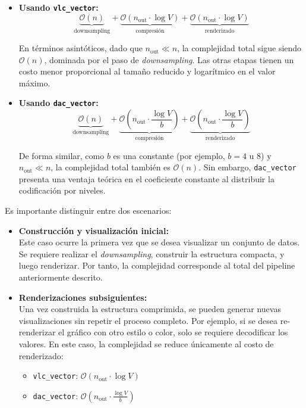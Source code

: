 \begin{itemize}
    \item \textbf{Usando \texttt{vlc\_vector}:}
    \[
    \underbrace{\mathcal{O}(n)}_{\text{downsampling}} +
    \underbrace{\mathcal{O}(n_{\text{out}} \cdot \log V)}_{\text{compresión}} +
    \underbrace{\mathcal{O}(n_{\text{out}} \cdot \log V)}_{\text{renderizado}}
    \]
    
    En términos asintóticos, dado que \(n_{\text{out}} \ll n\), la complejidad total sigue siendo \(\mathcal{O}(n)\), dominada por el paso de \textit{downsampling}. Las otras etapas tienen un costo menor proporcional al tamaño reducido y logarítmico en el valor máximo.

    \item \textbf{Usando \texttt{dac\_vector}:}
    \[
    \underbrace{\mathcal{O}(n)}_{\text{downsampling}} +
    \underbrace{\mathcal{O}\left(n_{\text{out}} \cdot \frac{\log V}{b}\right)}_{\text{compresión}} +
    \underbrace{\mathcal{O}\left(n_{\text{out}} \cdot \frac{\log V}{b}\right)}_{\text{renderizado}}
    \]

    De forma similar, como \(b\) es una constante (por ejemplo, \(b = 4\) u \(8\)) y \(n_{\text{out}} \ll n\), la complejidad total también es \(\mathcal{O}(n)\). Sin embargo, \texttt{dac\_vector} presenta una ventaja teórica en el coeficiente constante al distribuir la codificación por niveles.
\end{itemize}

\bigskip

\noindent Es importante distinguir entre dos escenarios:

\begin{itemize}
    \item \textbf{Construcción y visualización inicial:} \\
    Este caso ocurre la primera vez que se desea visualizar un conjunto de datos. Se requiere realizar el \textit{downsampling}, construir la estructura compacta, y luego renderizar. Por tanto, la complejidad corresponde al total del pipeline anteriormente descrito.

    \item \textbf{Renderizaciones subsiguientes:} \\
    Una vez construida la estructura comprimida, se pueden generar nuevas visualizaciones sin repetir el proceso completo. Por ejemplo, si se desea re-renderizar el gráfico con otro estilo o color, solo se requiere decodificar los valores. En este caso, la complejidad se reduce únicamente al costo de renderizado:
    \begin{itemize}
        \item \texttt{vlc\_vector}: \(\mathcal{O}(n_{\text{out}} \cdot \log V)\)
        \item \texttt{dac\_vector}: \(\mathcal{O}\left(n_{\text{out}} \cdot \frac{\log V}{b}\right)\)
    \end{itemize}
\end{itemize}


